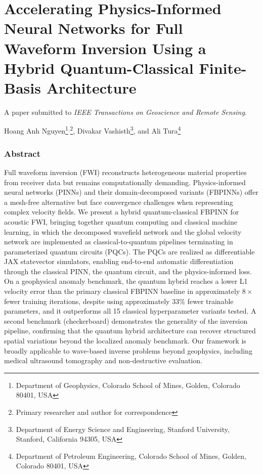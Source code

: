 \chapter{Accelerating Physics-Informed Neural Networks for Full Waveform Inversion Using a Hybrid Quantum-Classical Finite-Basis Architecture}\label{chap:qufwi}

\begin{center}
    A paper submitted to \emph{IEEE Transactions on Geoscience and Remote Sensing}.

    Hoang Anh Nguyen\footnote{Department of Geophysics, Colorado School of Mines, Golden, Colorado 80401, USA\label{note:ch4-mines-geophysics}}$^,$\footnote{Primary researcher and author for correspondence},
    Divakar Vashisth\footnote{Department of Energy Science and Engineering, Stanford University, Stanford, California 94305, USA},
    and Ali Tura\footnote{Department of Petroleum Engineering, Colorado School of Mines, Golden, Colorado 80401, USA}
\end{center}


\subsection{Abstract}

Full waveform inversion (FWI) reconstructs heterogeneous material properties from receiver data but remains computationally demanding. Physics-informed neural networks (PINNs) and their domain-decomposed variants (FBPINNs) offer a mesh-free alternative but face convergence challenges when representing complex velocity fields. We present a hybrid quantum-classical FBPINN for acoustic FWI, bringing together quantum computing and classical machine learning, in which the decomposed wavefield network and the global velocity network are implemented as classical-to-quantum pipelines terminating in parameterized quantum circuits (PQCs). The PQCs are realized as differentiable JAX statevector simulators, enabling end-to-end automatic differentiation through the classical PINN, the quantum circuit, and the physics-informed loss. On a geophysical anomaly benchmark, the quantum hybrid reaches a lower L1 velocity error than the primary classical FBPINN baseline in approximately $8\times$ fewer training iterations, despite using approximately $33$\% fewer trainable parameters, and it outperforms all 15 classical hyperparameter variants tested. A second benchmark (checkerboard) demonstrates the generality of the inversion pipeline, confirming that the quantum hybrid architecture can recover structured spatial variations beyond the localized anomaly benchmark. Our framework is broadly applicable to wave-based inverse problems beyond geophysics, including medical ultrasound tomography and non-destructive evaluation.

